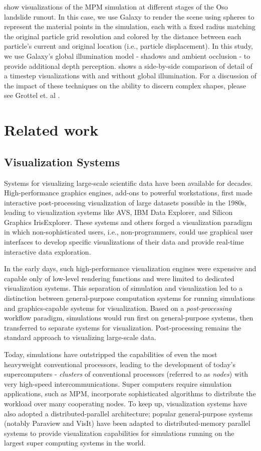 \documentclass[journal]{IEEEtran}
\begin{document}
 show visualizations of the MPM simulation at different stages of the Oso landslide runout.   In this case, we use Galaxy to render the scene using spheres to represent the material points in the simulation, each with a fixed radius matching the original particle grid resolution and colored by the distance between each particle's current and original location (i.e., particle displacement).  In this study, we use Galaxy's global illumination model - shadows and ambient occlusion - to provide additional depth perception.   shows a side-by-side comparison of detail of a timestep visualizations with and without global illumination.    For a discussion of the impact of these techniques on the ability to discern complex shapes, please see Grottel et. al \cite{Grottel12}.

\section{Related work}
\subsection{Visualization Systems}
Systems for visualizing large-scale scientific data have been available for decades.  High-performance graphics engines, add-ons to powerful workstations, first made interactive post-processing visualization of large datasets possible in the 1980s, leading to visualization systems like AVS, IBM Data Explorer, and Silicon Graphics IrisExplorer.  These systems and others forged a visualization paradigm in which non-sophisticated users, i.e., non-programmers, could use graphical user interfaces to develop specific visualizations of their data and provide real-time interactive data exploration.  

In the early days, such high-performance visualization engines were expensive and capable only of low-level rendering functions and were limited to dedicated visualization systems.  This separation of simulation and visualization led to a distinction between general-purpose computation systems for running simulations and graphics-capable systems for visualization.  Based on a \textit{post-processing} workflow paradigm, simulations would run first on general-purpose systems, then transferred to separate systems for visualization.  Post-processing remains the standard approach to visualizing large-scale data.

Today, simulations have outstripped the capabilities of even the most heavyweight conventional processors, leading to the development of today's supercomputers - \textit{clusters} of conventional processors (referred to as \textit{nodes}) with very high-speed intercommunications. Super computers require simulation applications, such as MPM, incorporate sophisticated algorithms to distribute the workload over many cooperating nodes. To keep up, visualization systems have also adopted a distributed-parallel architecture; popular general-purpose systems (notably Paraview and VisIt) have been adapted to distributed-memory parallel systems to provide visualization capabilities for simulations running on the largest super computing systems in the world.
\end{document}
